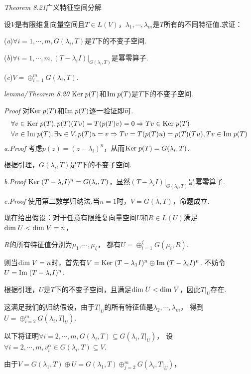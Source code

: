 \textit{Theorem 8.21}{\kaishu 广义特征空间分解}

设\(V\)是有限维复向量空间且\(T \in L(V)\)，\(\lambda_1,\cdots,\lambda_m\)是\(T\)所有的不同特征值.求证：

(\textit{a})\(\forall i=1,\cdots,m,G(\lambda_i,T)\)是\(T\)下的不变子空间.

(\textit{b})\(\forall i=1,\cdots,m,(T-\lambda_i I)|_{G(\lambda_i,T)}\)是幂零算子.

(\textit{c})\(V=\oplus_{i=1}^m G(\lambda_i,T)\).

\textit{lemma/Theorem 8.20}
\(\mathrm{Ker \;} p(T)\)和\(\mathrm{Im \;} p(T)\)是\(T\)下的不变子空间.

\textit{Proof}
    对\(\mathrm{Ker \;} p(T)\)和\(\mathrm{Im \;} p(T)\)逐一验证即可.
    \begin{align*}
        &\forall v \in \mathrm{Ker \;} p(T),p(T)(Tv)=T(p(T)v)=0 \Rightarrow Tv \in \mathrm{Ker \;} p(T) \\
        &\forall v \in \mathrm{Im \;} p(T),\exists u \in V,p(T)u=v \Rightarrow Tv=T(p(T)u)=p(T)(Tu),Tv \in \mathrm{Im \;} p(T)
    \end{align*}
\textit{a.Proof}
考虑\(p(z)=(z-\lambda_i)^n\)，从而\(\mathrm{Ker \;} p(T)=G(\lambda_i,T)\).

根据引理，\(G(\lambda_i,T)\)是\(T\)下的不变子空间.

\textit{b.Proof}
\(\mathrm{Ker \;} (T-\lambda_i I)^n=G(\lambda_i,T)\)，显然\((T-\lambda_i I)|_{G(\lambda_i,T)}\)是幂零算子.

\textit{c.Proof}
使用第二数学归纳法.当\(n=1\)时，\(V=G(\lambda,T)\)，命题成立.

现在给出假设：对于任意有限维复向量空间\(U\)和\(R \in L(U)\)满足\(\mathrm{dim \;} U<\mathrm{dim \;} V=n\)，

\(R\)的所有特征值分别为\(\mu_1,\cdots,\mu_\zeta\)，
都有\(U=\oplus_{i=1}^\zeta G(\mu_i,R)\).

则当\(\mathrm{dim \;} V=n\)时，首先有\(V=\mathrm{Ker \;} (T-\lambda_1 I)^n \oplus \mathrm{Im \;} (T-\lambda_i I)^n\).
不妨令\(U=\mathrm{Im \;} (T-\lambda_i I)^n\).

根据引理，\(U\)是\(T\)下的不变子空间，且满足\(\mathrm{dim \;} U<\mathrm{dim \;} V\)，因此\(T|_U\)存在.

这满足我们的归纳假设，由于\(T|_U\)的所有特征值是\(\lambda_2,\cdots,\lambda_m\)，
得到\(U=\oplus_{i=2}^m G(\lambda_i,T|_U)\).

以下将证明\(\forall i=2,\cdots,m,G(\lambda_i,T) \subseteq G(\lambda_i,T|_U)\)，
设\(\forall i=2,\cdots,m,v_i^\alpha \in G(\lambda_i,T) \subseteq V\).

由于\(V=G(\lambda_1,T) \oplus U=G(\lambda_1,T) \oplus_{j=2}^m G(\lambda_i,T|_U)\)，

